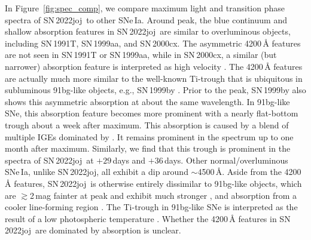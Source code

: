 \documentclass[twocolumn]{aastex631}
\newcommand{\sn}{SN\,2022joj}
\begin{document}
\begin{CJK*}{UTF8}{gbsn}
In Figure~\ref{fig:spec_comp}, we compare maximum light and transition phase spectra of \sn\ to other SNe\,Ia. Around peak, the blue continuum and shallow absorption features in \sn\ are similar to overluminous objects, including SN\,1991T, SN\,1999aa, and SN\,2000cx. The asymmetric 4200\,\r{A} features are not seen in SN\,1991T or SN\,1999aa, while in SN\,2000cx, a similar (but narrower) absorption feature is interpreted as high velocity  \citep{Branch_00cx_2004}. The 4200\,\r{A} features are actually much more similar to the well-known Ti-trough that is ubiquitous in subluminous 91bg-like objects, e.g., SN\,1999by \citep{Arbour_1999}. Prior to the peak, SN\,1999by also shows this asymmetric absorption at about the same wavelength. In 91bg-like SNe, this absorption feature becomes more prominent with a nearly flat-bottom trough about a week after maximum. This absorption is caused by a blend of multiple IGEs dominated by  \citep{Filippenko_91bg_1992,Mazzali_1997}. It remains prominent in the spectrum up to one month after maximum. Similarly, we find that this trough is prominent in the spectra of \sn\ at $+29$\,days and $+36$\,days. Other normal/overluminous SNe\,Ia, unlike \sn, all exhibit a dip around $\sim$4500\,\r{A}. Aside from the 4200\,\r{A} features, \sn\ is otherwise entirely dissimilar to 91bg-like objects, which are $\gtrsim$2\,mag fainter at peak and exhibit much stronger ,  and  absorption from a cooler line-forming region \citep{Filippenko_91bg_1992}. The Ti-trough in 91bg-like SNe is interpreted as the result of a low photospheric temperature \citep{Mazzali_1997}. Whether the 4200\,\r{A} features in \sn\ are dominated by  absorption is unclear.


\end{CJK*}
\end{document}

